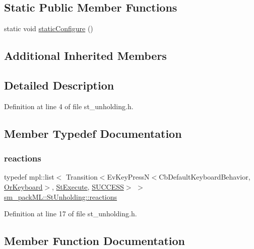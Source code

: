 \subsection*{Static Public Member Functions}
\begin{DoxyCompactItemize}
\item 
static void \hyperlink{structsm__packML_1_1StUnholding_af10ed2a8a3468eeff32c4466544c7efa}{static\+Configure} ()
\end{DoxyCompactItemize}
\subsection*{Additional Inherited Members}


\subsection{Detailed Description}


Definition at line 4 of file st\+\_\+unholding.\+h.



\subsection{Member Typedef Documentation}
\mbox{\label{structsm__packML_1_1StUnholding_a3818ebacf18ce5dd2351fdfa84254354}} 
\subsubsection{\texorpdfstring{reactions}{reactions}}
{\footnotesize\ttfamily typedef mpl\+::list$<$ Transition$<$Ev\+Key\+PressN$<$Cb\+Default\+Keyboard\+Behavior, \hyperlink{classsm__packML_1_1OrKeyboard}{Or\+Keyboard}$>$, \hyperlink{structsm__packML_1_1StExecute}{St\+Execute}, \hyperlink{classSUCCESS}{S\+U\+C\+C\+E\+SS}$>$ $>$ \hyperlink{structsm__packML_1_1StUnholding_a3818ebacf18ce5dd2351fdfa84254354}{sm\+\_\+pack\+M\+L\+::\+St\+Unholding\+::reactions}}



Definition at line 17 of file st\+\_\+unholding.\+h.



\subsection{Member Function Documentation}
\mbox{\label{structsm__packML_1_1StUnholding_a2f5506132c1e20686a83fcbe4e3c3861}} 
